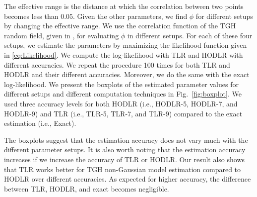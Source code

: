 \documentclass[conference]{IEEEtran}
\begin{document}
The effective range is the distance at which the correlation between two points becomes less than $0.05$. Given the other parameters, we find $\phi$ for different setups by changing the effective range. We use the correlation function of the TGH random field, given in \cite{xu2017tukey}, for evaluating $\phi$ in different setups. 
For each of these four setups, we estimate the parameters by maximizing the likelihood function given in \eqref{eq:Likelihood}. We compute the log-likelihood with TLR and HODLR with different accuracies. We repeat the procedure 100 times for both TLR and HODLR and their different accuracies. Moreover, we do the same with the exact log-likelihood. We present the boxplots of the estimated parameter values for different setups and different computation techniques in Fig.~\ref{fig:boxplot}. We used three accuracy levels for both HODLR (i.e., HODLR-5, HODLR-7, and HODLR-9) and TLR (i.e., TLR-5, TLR-7, and TLR-9) compared to the exact estimation (i.e., Exact).


The boxplots suggest that the estimation accuracy does not vary much with the different parameter setups. It is also worth noting that the estimation accuracy increases if we increase the accuracy of TLR or HODLR. Our result also shows that TLR works better for TGH non-Gaussian model estimation compared to HODLR over different accuracies. As expected for higher accuracy, the difference between TLR, HODLR, and exact becomes negligible.


\end{document}
